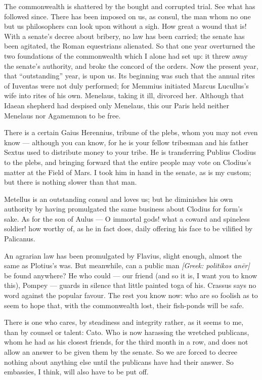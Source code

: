  The commonwealth is shattered by the bought and corrupted trial. See what has followed since. There has been imposed on us, as consul, the man whom no one but us philosophers can look upon without a sigh. How great a wound that is! With a senate's decree about bribery, no law has been carried; the senate has been agitated, the Roman equestrians alienated. So that one year overturned the two foundations of the commonwealth which I alone had set up: it threw away the senate's authority, and broke the concord of the orders. Now the present year, that ``outstanding'' year, is upon us. Its beginning was such that the annual rites of Iuventas were not duly performed; for Memmius initiated Marcus Lucullus's wife into rites of his own. Menelaus, taking it ill, divorced her. Although that Idaean shepherd had despised only Menelaus, this our Paris held neither Menelaus nor Agamemnon to be free.

 There is a certain Gaius Herennius, tribune of the plebs, whom you may not even know --- although you can know, for he is your fellow tribesman and his father Sextus used to distribute money to your tribe. He is transferring Publius Clodius to the plebs, and bringing forward that the entire people may vote on Clodius's matter at the Field of Mars. I took him in hand in the senate, as is my custom; but there is nothing slower than that man.

 Metellus is an outstanding consul and loves us; but he diminishes his own authority by having promulgated the same business about Clodius for form's sake. As for the son of Aulus --- O immortal gods! what a coward and spineless soldier! how worthy of, as he in fact does, daily offering his face to be vilified by Palicanus.

 An agrarian law has been promulgated by Flavius, slight enough, almost the same as Plotius's was. But meanwhile, can a public man \textit{[Greek: politikos an\=er]} be found anywhere? He who could --- our friend (and so it is, I want you to know this), Pompey --- guards in silence that little painted toga of his. Crassus says no word against the popular favour. The rest you know now: who are so foolish as to seem to hope that, with the commonwealth lost, their fish-ponds will be safe.

 There is one who cares, by steadiness and integrity rather, as it seems to me, than by counsel or talent: Cato. Who is now harassing the wretched publicans, whom he had as his closest friends, for the third month in a row, and does not allow an answer to be given them by the senate. So we are forced to decree nothing about anything else until the publicans have had their answer. So embassies, I think, will also have to be put off.


